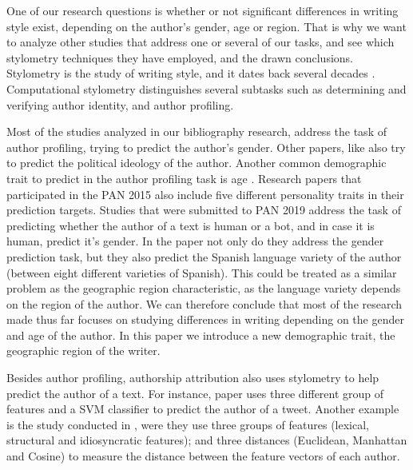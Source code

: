 One of our research questions is whether or not significant differences in writing style exist, depending on the author's gender, age or region. That is why we want to analyze other studies that address one or several of our tasks, and see which stylometry techniques they have employed, and the drawn conclusions. Stylometry is the study of writing style, and it dates back several decades \cite{mosteller1963inference}. Computational stylometry distinguishes several subtasks such as determining and verifying author identity, and author profiling.

Most of the studies analyzed in our bibliography research, address the task of author profiling, trying to predict the author's gender. Other papers, like \cite{garcia2022psychographic,espin2022sinai} also try to predict the political ideology of the author. Another common demographic trait to predict in the author profiling task is age \cite{surendran2017stylometry, markov2016adapting,bougiatiotis2016author,delmondes2022multi,radha2022feature,alroobaea2020decision,tai2020online,wu2019neural,alroobaea2020empirical}. Research papers that participated in the PAN 2015 \cite{ifrah2015identification,grivas2015author} also include five different personality traits in their prediction targets. Studies that were submitted to PAN 2019 \cite{valencia2019bots,ouni2021toward,joo2019author} address the task of predicting whether the author of a text is human or a bot, and in case it is human, predict it's gender. In the paper \cite{gomez2019convolutional} not only do they address the gender prediction task, but they also predict the Spanish language variety of the author (between eight different varieties of Spanish). This could be treated as a similar problem as the geographic region characteristic, as the language variety depends on the region of the author. We can therefore conclude that most of the research made thus far focuses on studying differences in writing depending on the gender and age of the author. In this paper we introduce a new demographic trait, the geographic region of the writer.

Besides author profiling, authorship attribution also uses stylometry to help predict the author of a text. For instance, paper \cite{bhargava2013stylometric} uses three different group of features and a \acrshort{SVM} classifier to predict the author of a tweet. Another example is the study conducted in \cite{belvisi2020forensic}, were they use three groups of features (lexical, structural and idiosyncratic features); and three distances (Euclidean, Manhattan and Cosine) to measure the distance between the feature vectors of each author.  

